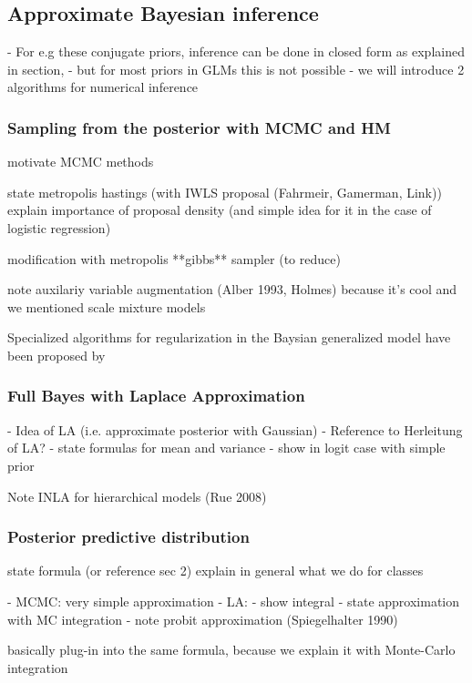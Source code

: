 \subsection{Approximate Bayesian inference} \label{sec:logit-inf}

- For e.g these conjugate priors, inference can be done in closed form as explained in section, 
- but for most priors in GLMs this is not possible
- we will introduce 2 algorithms for numerical inference

\subsubsection*{Sampling from the posterior with MCMC and HM}

motivate MCMC methods

state metropolis hastings (with IWLS proposal (Fahrmeir, Gamerman, Link))
explain importance of proposal density (and simple idea for it in the case of logistic regression)

modification with metropolis **gibbs** sampler (to reduce)

note auxilariy variable augmentation (Alber 1993, Holmes) because it's cool and we mentioned scale mixture models


Specialized algorithms for regularization in the Baysian generalized model have been proposed by \citet{polson_bayesian_2013}

\subsubsection*{Full Bayes with Laplace Approximation}

- Idea of LA (i.e. approximate posterior with Gaussian)
- Reference to Herleitung of LA?
- state formulas for mean and variance
- show in logit case with simple prior

Note INLA for hierarchical models (Rue 2008)



\subsubsection*{Posterior predictive distribution}

state formula (or reference sec 2)
explain in general what we do for classes

- MCMC: very simple approximation
- LA:
    - show integral
    - state approximation with MC integration
    - note probit approximation (Spiegelhalter 1990)

basically plug-in into the same formula, because we explain it with Monte-Carlo integration

